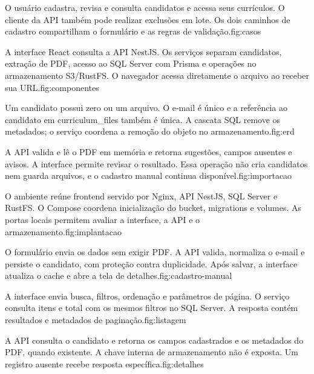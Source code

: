 {O usuário cadastra, revisa e consulta candidatos e acessa seus currículos.
O cliente da API também pode realizar exclusões em lote. Os dois caminhos
de cadastro compartilham o formulário e as regras de validação.}{fig:casos}

{A interface React consulta a API NestJS. Os serviços separam candidatos,
extração de PDF, acesso ao SQL Server com Prisma e operações no armazenamento
S3/RustFS. O navegador acessa diretamente o arquivo ao receber sua URL.}{fig:componentes}

{Um candidato possui zero ou um arquivo. O e-mail é único e a referência
ao candidato em curriculum\_files também é única. A cascata SQL remove os
metadados; o serviço coordena a remoção do objeto no armazenamento.}{fig:erd}

{A API valida e lê o PDF em memória e retorna sugestões, campos ausentes
e avisos. A interface permite revisar o resultado. Essa operação não cria
candidatos nem guarda arquivos, e o cadastro manual continua disponível.}{fig:importacao}

{O ambiente reúne frontend servido por Nginx, API NestJS, SQL Server e RustFS.
O Compose coordena inicialização do bucket, migrations e volumes. As portas
locais permitem avaliar a interface, a API e o armazenamento.}{fig:implantacao}

{O formulário envia os dados sem exigir PDF. A API valida, normaliza o e-mail
e persiste o candidato, com proteção contra duplicidade. Após salvar,
a interface atualiza o cache e abre a tela de detalhes.}{fig:cadastro-manual}

{A interface envia busca, filtros, ordenação e parâmetros de página.
O serviço consulta itens e total com os mesmos filtros no SQL Server.
A resposta contém resultados e metadados de paginação.}{fig:listagem}

{A API consulta o candidato e retorna os campos cadastrados e os metadados
do PDF, quando existente. A chave interna de armazenamento não é exposta.
Um registro ausente recebe resposta específica.}{fig:detalhes}

